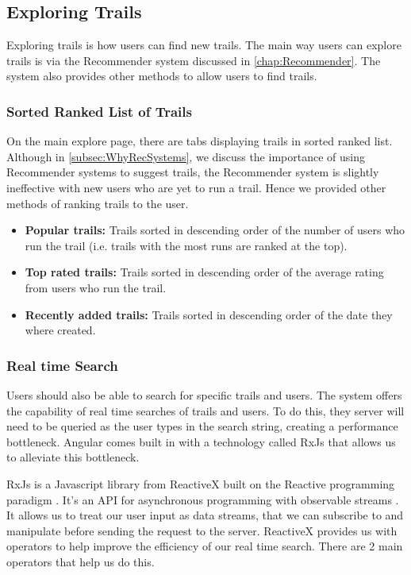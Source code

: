 \subsection{Exploring Trails}
Exploring trails is how users can find new trails. The main way users can explore trails is via the Recommender system discussed in \autoref{chap:Recommender}. The system also provides other methods to allow users to find trails.

\subsubsection{Sorted Ranked List of Trails}
On the main explore page, there are tabs displaying trails in sorted ranked list. Although in \autoref{subsec:WhyRecSystems}, we discuss the importance of using Recommender systems to suggest trails, the Recommender system is slightly ineffective with new users who are yet to run a trail. Hence we provided other methods of ranking trails to the user.

\begin{itemize}
    \item \textbf{Popular trails:} Trails sorted in descending order of the number of users who run the trail (i.e. trails with the most runs are ranked at the top). 
    \item \textbf{Top rated trails:} Trails sorted in descending order of the average rating from users who run the trail.
    \item \textbf{Recently added trails:} Trails sorted in descending order of the date they where created.
\end{itemize}

\subsubsection{Real time Search}
Users should also be able to search for specific trails and users. The system offers the capability of real time searches of trails and users. To do this, they server will need to be queried as the user types in the search string, creating a performance bottleneck. Angular comes built in with a technology called RxJs that allows us to alleviate this bottleneck.

RxJs is a Javascript library from ReactiveX built on the Reactive programming paradigm \cite{wan2000functional}. It's an API for asynchronous programming with observable streams \cite{reactivex2018main}. It allows us to treat our user input as data streams, that we can subscribe to and manipulate before sending the request to the server. ReactiveX provides us with operators to help improve the efficiency of our real time search. There are 2 main operators that help us do this.

